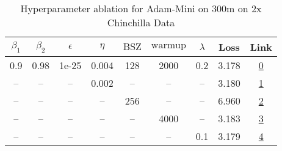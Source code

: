 \begin{table}[H]
\centering
\caption{Hyperparameter ablation for Adam-Mini on 300m on 2x Chinchilla Data}
\label{tab:ablation_adam-mini_300m_2}
\begin{tabular}{ccccccccc}
\toprule
$\beta_1$ & $\beta_2$ & $\epsilon$ & $\eta$ & $\mathrm{BSZ}$ & $\mathrm{warmup}$ & $\lambda$ & Loss & Link \\
\midrule
0.9 & 0.98 & 1e-25 & 0.004 & 128 & 2000 & 0.2 & 3.178 & \href{https://wandb.ai/stanford-mercury/optimizer-scaling/runs/sweep-300m-12B-mini9676c0lr0.004-wd0.2-minlr0-warmup2000-b10.9-b-80350d}{0} \\
\midrule
-- & -- & -- & 0.002 & -- & -- & -- & 3.180 & \href{https://wandb.ai/stanford-mercury/optimizer-scaling/runs/sweep-300m-12B-mini4cf513lr0.002-wd0.2-minlr0-warmup2000-b10.9-b-df6367}{1} \\
-- & -- & -- & -- & 256 & -- & -- & 6.960 & \href{https://wandb.ai/stanford-mercury/optimizer-scaling/runs/sweep-300m-12B-mini65d3bflr0.004-wd0.2-minlr0-warmup2000-b10.9-b-79c803}{2} \\
-- & -- & -- & -- & -- & 4000 & -- & 3.183 & \href{https://wandb.ai/stanford-mercury/optimizer-scaling/runs/sweep-300m-12B-minic35a69lr0.004-wd0.2-minlr0-warmup4000-b10.9-b-05ae30}{3} \\
-- & -- & -- & -- & -- & -- & 0.1 & 3.179 & \href{https://wandb.ai/stanford-mercury/optimizer-scaling/runs/sweep-300m-12B-minif8c6e5lr0.004-wd0.1-minlr0-warmup2000-b10.9-b-aa6c53}{4} \\
\bottomrule
\end{tabular}
\end{table}

